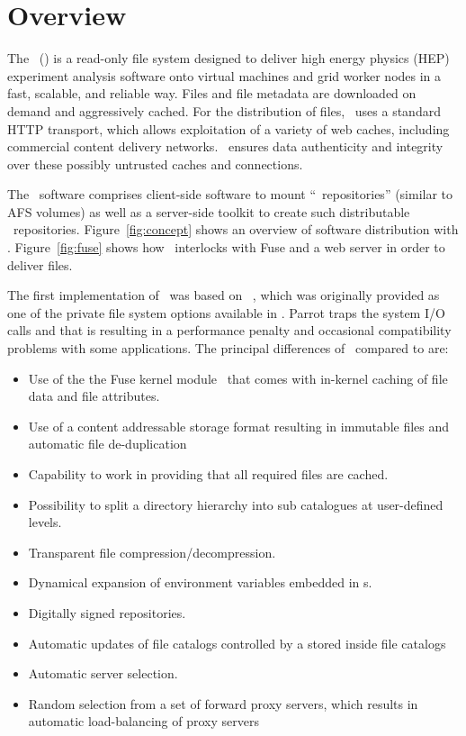 \chapter{Overview}

The \cernvmfs\ (\cvmfs) is a read-only file system designed to deliver high energy physics (HEP) experiment analysis software onto virtual machines and grid worker nodes in a fast, scalable, and reliable way.
Files and file metadata are downloaded on demand and aggressively cached.
For the distribution of files, \cvmfs\ uses a standard HTTP transport, which allows exploitation of a variety of web caches, including commercial content delivery networks.
\cvmfs\ ensures data authenticity and integrity over these possibly untrusted caches and connections. %

The \cvmfs\ software comprises client-side software to mount ``\cvmfs\ repositories'' (similar to AFS volumes) as well as a server-side toolkit to create such distributable \cvmfs\ repositories.
Figure~\ref{fig:concept} shows an overview of software distribution with \cvmfs.
Figure~\ref{fig:fuse} shows how \cvmfs\ interlocks with Fuse and a web server in order to deliver files.

The first implementation of \cvmfs\ was based on ~\cite{parrot05, growfs09}, which was originally provided as one of the private file system options available in . 
Parrot traps the system I/O calls and that is resulting in a performance penalty and occasional compatibility problems with some applications. 
The principal differences of \cvmfs\ compared to  are:
\begin{itemize}
	\item Use of the the Fuse kernel module~\cite{fuse} that comes with in-kernel caching of file data and file attributes.
	\item Use of a content addressable storage format resulting in immutable files and automatic file de-duplication
	\item Capability to work in  providing that all required files are cached.
	\item Possibility to split a directory hierarchy into sub catalogues at user-defined levels.
	\item Transparent file compression/decompression.
	\item Dynamical expansion of environment variables embedded in s.
	\item Digitally signed repositories.
	\item Automatic updates of file catalogs controlled by a  stored inside file catalogs
	\item Automatic server selection.
	\item Random selection from a set of forward proxy servers, which results in automatic load-balancing of proxy servers
\end{itemize}

